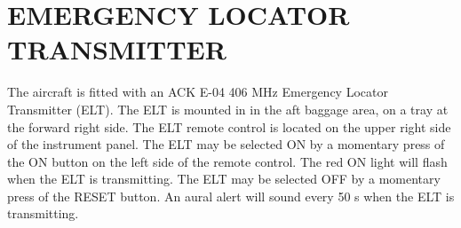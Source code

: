 \section{EMERGENCY LOCATOR TRANSMITTER}

The aircraft is fitted with an ACK E-04 406 MHz Emergency Locator Transmitter (ELT). The ELT is mounted in in the aft baggage area, on a tray at the forward right side. The ELT remote control is located on the upper right side of the instrument panel. The ELT may be selected ON by a momentary press of the ON button on the left side of the remote control. The red ON light will flash when the ELT is transmitting. The ELT may be selected OFF by a momentary press of the RESET button. An aural alert will sound every 50 s when the ELT is transmitting.

